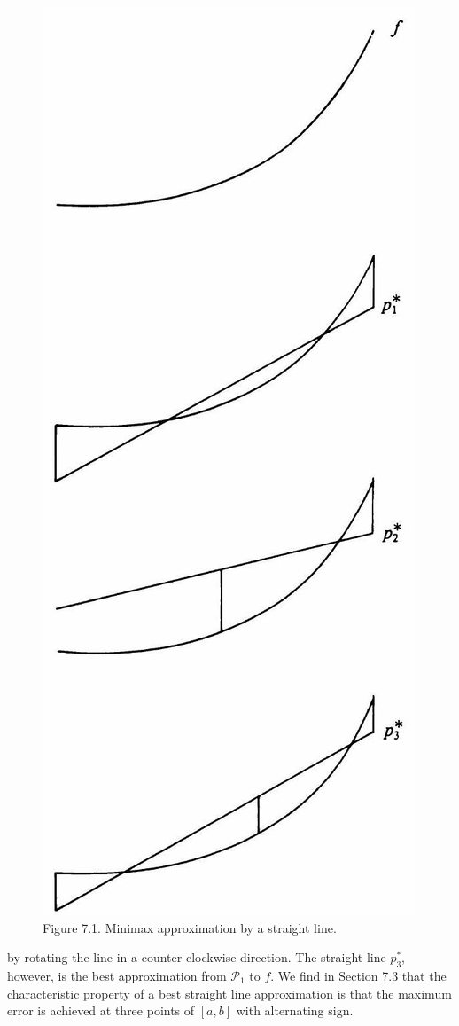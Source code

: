 \documentclass[11pt]{article}
\begin{document}
\begin{figure}[ht]
\includegraphics[max width=\textwidth, center]{2024_09_11_abbbcc72d07751cb658ag-084}
\caption{Figure 7.1. Minimax approximation by a straight line.}
\end{figure}
by rotating the line in a counter-clockwise direction. The straight line $p_{3}^{*}$, however, is the best approximation from $\mathscr{P}_{1}$ to $f$. We find in Section 7.3 that the characteristic property of a best straight line approximation is that the maximum error is achieved at three points of $[a, b]$ with alternating sign.
\end{document}
